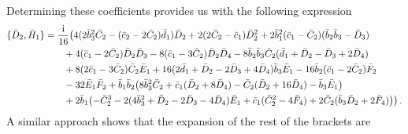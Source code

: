\documentclass[10pt]{amsart}
\theoremstyle{definition}
\theoremstyle{corollary}
\theoremstyle{remark}
\theoremstyle{conclusion}
\begin{document}
Determining these coefficients provides us with the following expression 
\begin{align}
    \{\bar{D}_2, \bar{H}_1\}&=\frac{{\rm i}}{16}\bigl(4(2\bar{b}_3^2\bar{C}_2-(\bar{c}_2-2\bar{C}_2)\bar{d}_1)\bar{D}_2 +2(2\bar{C}_2-\bar{c}_1)\bar{D}_2^2+2\bar{b}_1^2(\bar{c}_1-\bar{C}_2)(\bar{b}_2 \bar{b}_3-\bar{D}_3)\nonumber\\
& \hskip 0.7 cm+4(\bar{c}_1-2\bar{C}_2)\bar{D}_2 \bar{D}_3-8(\bar{c}_1-3 \bar{C}_2)\bar{D}_2 \bar{D}_4-8 \bar{b}_2 \bar{b}_3 \bar{C}_2(\bar{d}_1+\bar{D}_2-\bar{D}_3+2\bar{D}_4) \nonumber \\
& \hskip 0.7 cm+8(2\bar{c}_1-3 \bar{C}_2)\bar{C}_2 \bar{E}_1+16(2\bar{d}_1+\bar{D}_2-2\bar{D}_3+4\bar{D}_4)\bar{b}_3 \bar{E}_1-16\bar{b}_2(\bar{c}_1-2\bar{C}_2)\bar{F}_2 \nonumber \\
& \hskip 0.7 cm -32 \bar{E}_1 \bar{F}_2+\bar{b}_1 \bar{b}_2\bigl(8 \bar{b}_3^2 \bar{C}_2+\bar{c}_1(\bar{D}_2+8\bar{D}_4)-\bar{C}_2(\bar{D}_2+16 \bar{D}_4)-\bar{b}_3 \bar{E}_1 \bigl) \nonumber\\
& \hskip 0.7 cm +2 \bar{b}_1\bigl(-\bar{C}_2^3-2(4\bar{b}_3^2+\bar{D}_2-2 \bar{D}_3-4\bar{D}_4)\bar{E}_1 +\bar{c}_1(\bar{C}_2^2-4\bar{F}_4)+2\bar{C}_2(\bar{b}_3 \bar{D}_2+2\bar{F}_4)\bigl) \bigl) \, .
\end{align} 
A similar approach shows that the expansion of the rest of the brackets are
\end{document}

